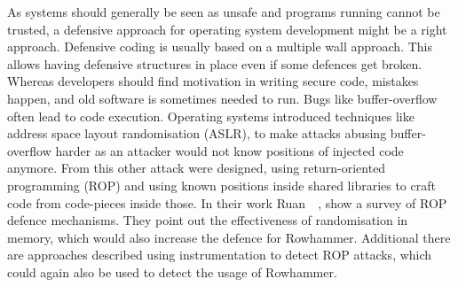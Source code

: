 As systems should generally be seen as unsafe and programs running cannot be
trusted, a defensive approach for operating system development might be a right
approach. Defensive coding is usually based on a multiple wall approach. This
allows having defensive structures in place even if some defences get broken.
Whereas developers should find motivation in writing secure code, mistakes
happen, and old software is sometimes needed to run. Bugs like buffer-overflow
often lead to code execution. Operating systems introduced techniques like
address space layout randomisation (ASLR), to make attacks abusing
buffer-overflow harder as an attacker would not know positions of injected code
anymore. From this other attack were designed, using return-oriented programming
(ROP) and using known positions inside shared libraries to craft code from
code-pieces inside those. In their work Ruan~\etal~\cite{ropsur}, show a survey
of ROP defence mechanisms. They point out the effectiveness of randomisation in
memory, which would also increase the defence for Rowhammer. Additional there
are approaches described using instrumentation to detect ROP attacks, which
could again also be used to detect the usage of Rowhammer.

